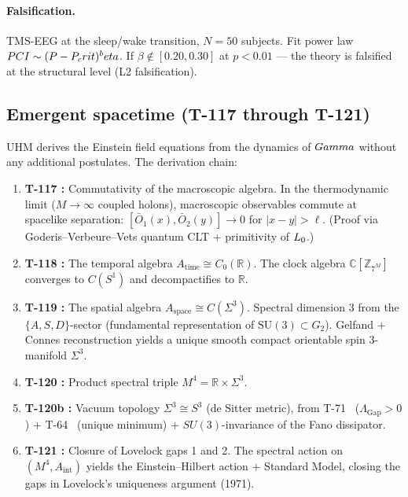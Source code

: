 \paragraph{Falsification.}
TMS-EEG at the sleep/wake transition, $N = 50$ subjects. Fit power law $PCI
\sim (P - P_crit)^beta$. If $\beta \notin [0.20, 0.30]$ at $p < 0.01$ --- the theory
is falsified at the structural level (L2 falsification).

\subsection{Emergent spacetime (T-117 through T-121)}
\label{subsec:emergent-spacetime}

UHM derives the Einstein field equations from the dynamics of $Gamma$ without any additional
postulates. The derivation chain:

\begin{enumerate}[leftmargin=2em]
  \item \textbf{T-117 :} Commutativity of the macroscopic algebra. In the
        thermodynamic limit ($M \to \infty$ coupled holons), macroscopic observables
        commute at spacelike separation: $[\bar{O}_1(x), \bar{O}_2(y)] \to 0$ for
        $|x-y| > \ell$. (Proof via Goderis--Verbeure--Vets quantum CLT + primitivity
        of $L_0$.)
  \item \textbf{T-118 :} The temporal algebra $A_{\mathrm{time}} \cong C_0(\mathbb{R})$.
        The clock algebra $\mathbb{C}[\mathbb{Z}_{7^M}]$ converges to $C(S^1)$ and
        decompactifies to $\mathbb{R}$.
  \item \textbf{T-119 :} The spatial algebra $A_{\mathrm{space}} \cong C(\Sigma^3)$.
        Spectral dimension 3 from the $\{A,S,D\}$-sector (fundamental representation of
        $\mathrm{SU}(3) \subset G_2$). Gelfand + Connes reconstruction yields a unique
        smooth compact orientable spin 3-manifold $\Sigma^3$.
  \item \textbf{T-120 :} Product spectral triple $M^4 = \mathbb{R} \times \Sigma^3$.
  \item \textbf{T-120b :} Vacuum topology $\Sigma^3 \cong S^3$ (de Sitter metric),
        from T-71~ ($\Lambda_{\mathrm{Gap}} > 0$) + T-64~ (unique minimum) +
        $SU(3)$-invariance of the Fano dissipator.
  \item \textbf{T-121 :} Closure of Lovelock gaps 1 and 2. The spectral action
        on $(M^4, A_{\mathrm{int}})$ yields the Einstein--Hilbert action $+$ Standard
        Model, closing the gaps in Lovelock's uniqueness argument (1971).
\end{enumerate}

